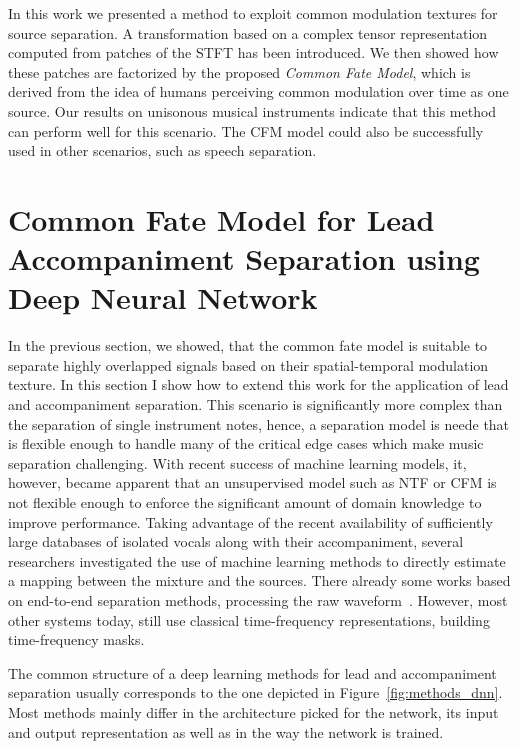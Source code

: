 In this work we presented a method to exploit common modulation textures for source separation. A transformation based on a complex tensor representation computed from patches of the STFT has been introduced. We then showed how these patches are factorized by the proposed \emph{Common Fate Model}, which is derived from the idea of humans perceiving common modulation over time as one source. Our results on unisonous musical instruments indicate that this method can perform well for this scenario. The CFM model could also be successfully used in other scenarios, such as speech separation.

\section{Common Fate Model for Lead Accompaniment Separation using Deep Neural Network}


In the previous section, we showed, that the common fate model is suitable to separate highly overlapped signals based on their spatial-temporal modulation texture.
In this section I show how to extend this work for the application of lead  and accompaniment separation.
This scenario is significantly more complex than the separation of single instrument notes, hence, a separation model is neede that is flexible enough to handle many of the critical edge cases which make music separation challenging.
With recent success of machine learning models, it, however, became apparent that an unsupervised model such as NTF or CFM is not flexible enough to enforce the significant amount of domain knowledge to improve performance.
Taking advantage of the recent availability of sufficiently large databases of isolated vocals along with their accompaniment, several researchers investigated the use of machine learning methods to directly estimate a mapping between the mixture and the sources.
There already some works based on end-to-end separation methods, processing the raw waveform~\cite{venkataramani17}.
However, most other systems today, still use classical time-frequency representations, building time-frequency masks.
\par
The common structure of a deep learning methods for lead and accompaniment separation usually corresponds to the one depicted in Figure~\ref{fig:methods_dnn}.
Most methods mainly differ in the architecture picked for the network, its input and output representation as well as in the way the network is trained.

